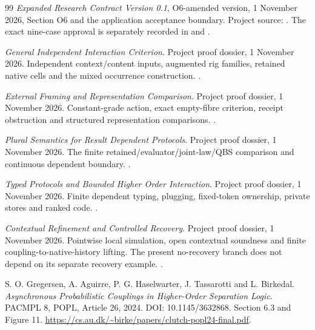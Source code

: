 \documentclass[11pt,a4paper]{article}
\theoremstyle{definition}
\begin{document}
\begin{thebibliography}{99}
\emph{Expanded Research Contract Version 0.1}, O6-amended version,
1 November 2026, Section O6 and the application acceptance boundary.
Project source: .
The exact nine-case approval is separately recorded in
 and
.

\emph{General Independent Interaction Criterion}. Project proof dossier,
1 November 2026. Independent context/content inputs, augmented rig
families, retained native cells and the mixed occurrence construction.
.

\emph{External Framing and Representation Comparison}. Project proof
dossier, 1 November 2026. Constant-grade action, exact empty-fibre
criterion, receipt obstruction and structured representation comparisons.
.

\emph{Plural Semantics for Result Dependent Protocols}. Project proof
dossier, 1 November 2026. The finite retained/evaluator/joint-law/QBS
comparison and continuous dependent boundary.
.

\emph{Typed Protocols and Bounded Higher Order Interaction}. Project
proof dossier, 1 November 2026. Finite dependent typing, plugging,
fixed-token ownership, private stores and ranked code.
.

\emph{Contextual Refinement and Controlled Recovery}. Project proof
dossier, 1 November 2026. Pointwise local simulation, open contextual
soundness and finite coupling-to-native-history lifting. The present
no-recovery branch does not depend on its separate recovery example.
.

S. O. Gregersen, A. Aguirre, P. G. Haselwarter, J. Tassarotti and
L. Birkedal. \emph{Asynchronous Probabilistic Couplings in Higher-Order
Separation Logic}. PACMPL 8, POPL, Article 26, 2024.
DOI: 10.1145/3632868. Section 6.3 and Figure 11.
\url{https://cs.au.dk/~birke/papers/clutch-popl24-final.pdf}.
\end{thebibliography}
\end{document}
